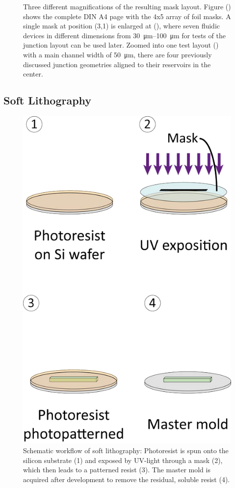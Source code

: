 \begin{figure}[h!]
	
	\caption{Three different magnifications of the resulting mask layout. Figure (\protect{}) shows the complete DIN A4 page with the 4x5 array of foil masks. A single mask at position (3,1) is enlarged at (\protect{}), where seven fluidic devices in different dimensions from \SIrange{30}{100}{\micro\meter} for tests of the junction layout can be used later. Zoomed into one test layout (\protect{}) with a main channel width of \SI{50}{\micro\meter}, there are four previously discussed junction geometries aligned to their reservoirs in the center.} 	
\end{figure}
\clearpage
\newpage


\subsection{Soft Lithography}
\begin{figure}
	\includegraphics[scale=.65,trim={0mm 0mm 0mm 8mm}]{Ressourcen/IMG/photolithographic-process-of-microfluidic-mold}%
	\caption{Schematic workflow of soft lithography: Photoresist is spun onto the silicon substrate (1) and exposed by UV-light through a mask (2), which then leads to a patterned resist (3). The master mold is acquired after development to remove the residual, soluble resist (4).  \cite{lit:nano:eveflow}}
	\label{fig:lithography:mold}
\end{figure}
